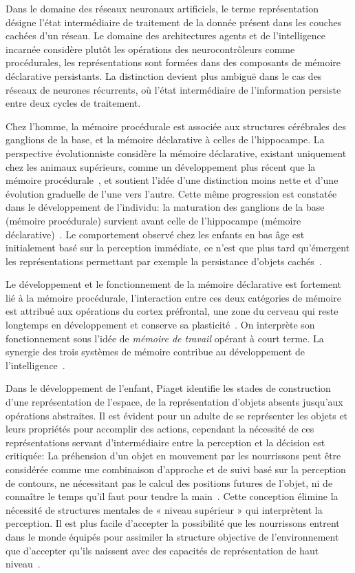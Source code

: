 Dans le domaine des réseaux neuronaux artificiels, le terme représentation désigne l'état intermédiaire de traitement de la donnée présent dans les couches cachées d'un réseau. Le domaine des architectures agents et de l'intelligence incarnée considère plutôt les opérations des neurocontrôleurs comme procédurales, les représentations sont formées dans des composants de mémoire déclarative persistants. La distinction devient plus ambiguë dans le cas des réseaux de neurones récurrents, où l'état intermédiaire de l'information persiste entre deux cycles de traitement. 

Chez l'homme, la mémoire procédurale est associée aux structures cérébrales des ganglions de la base, et la mémoire déclarative à celles de l'hippocampe. La perspective évolutionniste considère la mémoire déclarative, existant uniquement chez les animaux supérieurs, comme un développement plus récent que la mémoire procédurale~\cite{ten1999procedural}, et soutient l'idée d'une distinction moins nette et d'une évolution graduelle de l'une vers l'autre. Cette même progression est constatée dans le développement de l'individu: la maturation des ganglions de la base (mémoire procédurale) survient avant celle de l'hippocampe (mémoire déclarative)~\cite{casey2000structural}. Le comportement observé chez les enfants en bas âge est initialement basé sur la perception immédiate, ce n'est que plus tard qu'émergent les représentations permettant par exemple la persistance d'objets cachés~\cite{baillargeon1991object}.

Le développement et le fonctionnement de la mémoire déclarative est fortement lié à la mémoire procédurale, l'interaction entre ces deux catégories de mémoire est attribué aux opérations du cortex préfrontal, une zone du cerveau qui reste longtemps en développement et conserve sa plasticité~\cite{curtis2003persistent}. On interprète son fonctionnement sous l'idée de \emph{mémoire de travail} opérant à court terme. La synergie des trois systèmes de mémoire contribue au développement de l'intelligence~\cite{quamprocedural}.

Dans le développement de l'enfant, Piaget identifie les stades de construction d'une représentation de l'espace, de la représentation d'objets absents jusqu'aux opérations abstraites. Il est évident pour un adulte de se représenter les objets et leurs propriétés pour accomplir des actions, cependant la nécessité de ces représentations servant d'intermédiaire entre la perception et la décision est critiquée: La préhension d'un objet en mouvement par les nourrissons peut être considérée comme une combinaison d'approche et de suivi basé sur la perception de contours, ne nécessitant pas le calcul des positions futures de l'objet, ni de connaître le temps qu'il faut pour tendre la main~\cite{von1985object}. Cette conception élimine la nécessité de structures mentales de « niveau supérieur » qui interprètent la perception. Il est plus facile d'accepter la possibilité que les nourrissons entrent dans le monde équipés pour assimiler la structure objective de l'environnement que d'accepter qu'ils naissent avec des capacités de représentation de haut niveau~\cite{Bremner2000}.

